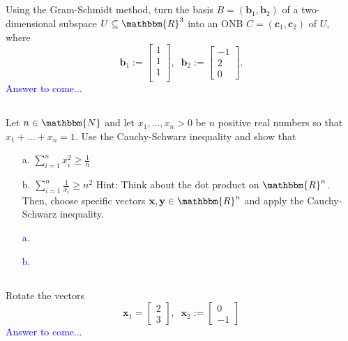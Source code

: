 \documentclass[a4paper,12pt]{article}
\newcommand{\R}{\mathbbm{R}}
\newcommand{\N}{\mathbbm{N}}
\newcommand{\M}[1]{ \begin{bmatrix} #1 \end{bmatrix} }
\newcommand{\vecx}{\textbf{x}}
\newcommand{\vecy}{\textbf{y}}
\newcommand{\vecb}{\textbf{b}}
\newcommand{\vecc}{\textbf{c}}
\newcommand{\stsum}{\sum_{i=1}^n}
\begin{document}
\subsection{}
Using the Gram-Schmidt method, turn the basis $B = (\vecb_1, \vecb_2)$ of a two-dimensional subspace $U \subseteq \R^3$ into an ONB $C = (\vecc_1, \vecc_2)$ of $U$, where
$$\vecb_1 := \M{1\\1\\1\\}, \;\; \vecb_2 := \M{-1\\2\\0}.$$
\textcolor{blue}{
Answer to come...
}
\subsection{}
Let $n \in \N$ and let $x_1, ... , x_n > 0$ be $n$ positive real numbers so that $x_1+...+x_n=1$. Use the Cauchy-Schwarz inequality and show that
\begin{itemize}
 \item [a.] $\stsum x_i^2 \geq \frac{1}{n}$
 \item [b.] $\stsum \frac{1}{x_i} \geq n^2$
 Hint: Think about the dot product on $\R^n$. Then, choose specific vectors $\vecx, \vecy \in \R^n$ and apply the Cauchy-Schwarz inequality.
\end{itemize}
\textcolor{blue}{
\begin{itemize}
 \item [a.] 
 \item [b.] 
\end{itemize}
}
\subsection{}
Rotate the vectors 
$$\vecx_1 = \M{2\\3}, \;\; \vecx_2 := \M{0\\-1}$$
\textcolor{blue}{
Answer to come...
}
\newpage%
\end{document}

